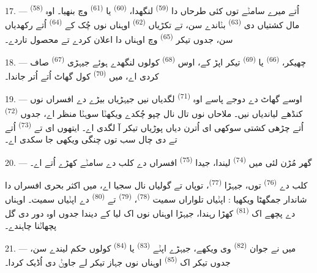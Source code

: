 17. ---  \textsuperscript{(58)} اُتے میرے سامݨے توں کئی طرحاں دا
 \textsuperscript{(59)} لنگھدا،  \textsuperscript{(60)}
یا  \textsuperscript{(61)} وچ بنھیا۔ اوہ مال کشتیاں دی
 \textsuperscript{(63)} بݨاندے سن، تے تکڑیاں 
\textsuperscript{(62)} اوہناں نوں چُک کے  \textsuperscript{(64)} اُتے
رکھدیاں سن، جدوں تیکر   \textsuperscript{(65)} وچ
اوہناں دا اعلان کردے تے محصول تاردے۔

18. --- چھیکر،  \textsuperscript{(66)} یا
 \textsuperscript{(69)} تیکر اپڑ کے، اوس 
\textsuperscript{(68)} کولوں لنگھدے ہوئے جیہڑی  \textsuperscript{(67)}
صاف کردی اے، میں  \textsuperscript{(70)} کول گھاٹ اُتے اُتر
جاندا۔

19. --- اوسے گھاٹ دے دوجے پاسے اوہ  \textsuperscript{(71)}
لگدیاں نیں جیہڑیاں بیڑے دے افسراں نوں کنڈھے لیاندیاں نیں۔ ملاحاں نوں تال نال چپو
چُکدے ویکھݨا سوہݨا منظر اے، جدوں  \textsuperscript{(72)} اُتے چڑھی کشتی
سوکھی ای اُترن دیاں پوڑیاں تیکر آ لگدی اے۔ ایتھوں ای  تے
 \textsuperscript{(73)} اُتے  تے  دی چال سب
توں چنگی ویکھی جا سکدی اے۔

\VUsaut{3.0mm}
\VUsaut{3.0mm}

20. --- گھر مُڑن لئی میں  \textsuperscript{(74)} لیندا، جیدا
 \textsuperscript{(75)} افسراں دے کلب دے سامݨے کھڑے 
اُتے اے۔

کلب دے  \textsuperscript{(76)} توں، جیہڑا 
\textsuperscript{(77)}، توپاں تے گولیاں نال سجیا اے، میں اکثر بحری افسراں دا شاندار
جمگھٹا ویکھیا : اپݨیاں تلواراں سمیت  \textsuperscript{(78)}،
 \textsuperscript{(79)} تے  \textsuperscript{(80)}
دے  اپݨیاں  سمیت۔ اوہناں دے پچھے اک 
\textsuperscript{(81)} کھڑا رہندا، جیہڑا اوہناں نوں اک  لیا کے دیندا
جدوں اوہ دور دی گل پچھاݨنا چاہندے۔

21. --- میں نے جوان  \textsuperscript{(82)} وی ویکھے، جیہڑے
اپݨے  \textsuperscript{(83)} یا  \textsuperscript{(84)}
کولوں حکم لیندے سن، جدوں تیکر اک  \textsuperscript{(85)} اوہناں
نوں جہاز تیکر لے جاوݨ دی اُڈیک کردا۔

